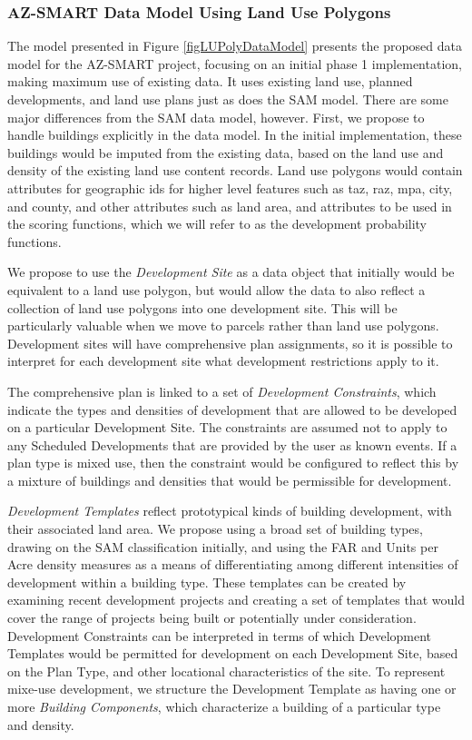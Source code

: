 \subsubsection{AZ-SMART Data Model Using Land Use Polygons}

The model presented in Figure \ref{figLUPolyDataModel} presents the proposed data model for
the AZ-SMART project, focusing on an initial phase 1 implementation, making maximum use of
existing data.  It uses existing land use, planned developments, and land use plans just as
does the SAM model.  There are some major differences from the SAM data model, however.
First, we propose to handle buildings explicitly in the data model.  In the initial implementation, 
these buildings would be
imputed from the existing data, based on the land use and density of the existing land use
content records.  Land use polygons would contain attributes for
geographic ids for higher level features such as taz, raz, mpa, city, and county,
and other attributes such as land area, and attributes to be used in the scoring functions, which
we will refer to as the development probability functions.

We propose to use the \emph{Development Site} as a data object that initially would be equivalent to a
land use polygon, but would allow the data to also reflect a collection of land use polygons 
into one development site.  This will be particularly valuable when we move to parcels rather 
than land use polygons.  Development sites will have comprehensive plan assignments, so
it is possible to interpret for each development site what development restrictions apply to it.

The comprehensive plan is linked to a set of \emph{Development Constraints}, which indicate the types
and densities of development that are allowed to be developed on a particular Development Site.
The constraints are assumed not to apply to any Scheduled Developments that are provided
by the user as known events.  If a plan type is mixed use, then the constraint would be configured
to reflect this by a mixture of buildings and densities that would be permissible for development.

\emph{Development Templates} reflect prototypical kinds of
building development, with their associated land area.  We propose using a broad set of building
types, drawing on the SAM classification initially, and using the FAR and Units per Acre density
measures as a means of differentiating among different intensities of development within a building
type.  These templates can be created by examining recent development projects and creating a 
set of templates that would cover the range of projects being built or potentially under consideration. 
Development Constraints can be interpreted in terms of which Development Templates would be permitted
for development on each Development Site, based on the Plan Type, and other locational characteristics
of the site.   To represent mixe-use development, we structure the Development Template as having one
or more \emph{Building Components}, which characterize a building of a particular type and density.


